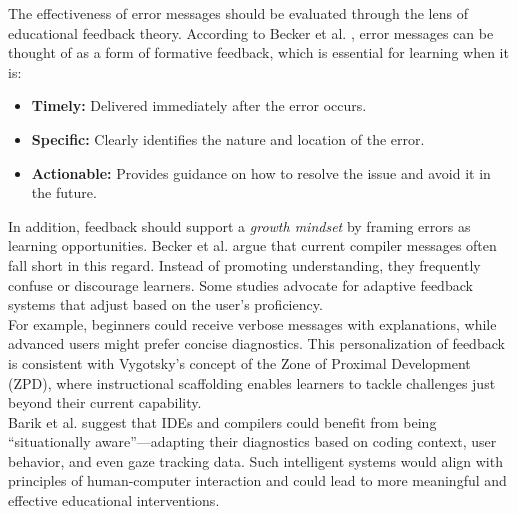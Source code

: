 The effectiveness of error messages should be evaluated through the lens of educational feedback theory.
According to Becker et al. \cite{becker}, error messages can be thought of as a form of formative feedback, which is essential for learning when it is:

\begin{itemize}
    \item \textbf{Timely:} Delivered immediately after the error occurs.
    \item \textbf{Specific:} Clearly identifies the nature and location of the error.
    \item \textbf{Actionable:} Provides guidance on how to resolve the issue and avoid it in the future.
\end{itemize}

\noindent In addition, feedback should support a \textit{growth mindset} by framing errors as learning opportunities.
Becker et al. argue that current compiler messages often fall short in this regard. Instead of promoting understanding, they frequently confuse or discourage learners.
Some studies advocate for adaptive feedback systems that adjust based on the user's proficiency.\\[5pt]
\noindent For example, beginners could receive verbose messages with explanations, while advanced users might prefer concise diagnostics.
This personalization of feedback is consistent with Vygotsky's concept of the Zone of Proximal Development (ZPD),
where instructional scaffolding enables learners to tackle challenges just beyond their current capability.\\[5pt]
\noindent Barik et al. suggest that IDEs and compilers could benefit from being ``situationally aware''—adapting their diagnostics based on coding context, user behavior, and even gaze tracking data.
Such intelligent systems would align with principles of human-computer interaction and could lead to more meaningful and effective educational interventions.




